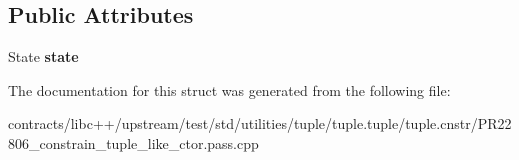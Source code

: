 \subsection*{Public Attributes}
\begin{DoxyCompactItemize}
\item 
\mbox{\label{struct_constructible_from_tuple_and_int_a828d31e85540f135f1d19ac7f1bd12e3}} 
State {\bfseries state}
\end{DoxyCompactItemize}


The documentation for this struct was generated from the following file\+:\begin{DoxyCompactItemize}
\item 
contracts/libc++/upstream/test/std/utilities/tuple/tuple.\+tuple/tuple.\+cnstr/P\+R22806\+\_\+constrain\+\_\+tuple\+\_\+like\+\_\+ctor.\+pass.\+cpp\end{DoxyCompactItemize}
